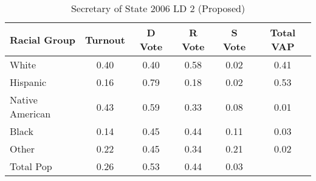 \begin{table}[htb]
\begin{center}
\caption{Secretary of State 2006 LD 2 (Proposed)}
\label{sos06_vap_ld_2}
\begin{tabular}{lccccc}
  \hline
Racial Group & Turnout & D Vote & R Vote & S Vote & Total VAP \\ 
  \hline
White & 0.40 & 0.40 & 0.58 & 0.02 & 0.41 \\ 
  Hispanic & 0.16 & 0.79 & 0.18 & 0.02 & 0.53 \\ 
  Native American & 0.43 & 0.59 & 0.33 & 0.08 & 0.01 \\ 
  Black & 0.14 & 0.45 & 0.44 & 0.11 & 0.03 \\ 
  Other & 0.22 & 0.45 & 0.34 & 0.21 & 0.02 \\ 
  Total Pop & 0.26 & 0.53 & 0.44 & 0.03 &  \\ 
   \hline
\end{tabular}
\end{center}
\end{table}
